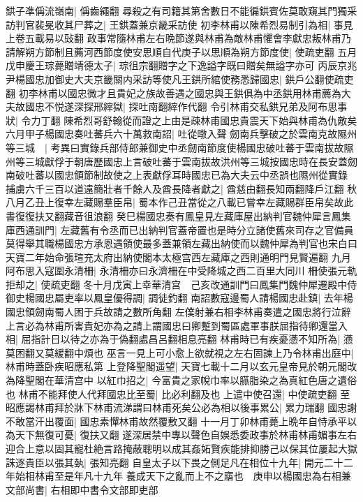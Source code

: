 鉷子凖偁流嶺南|{
	偁齒繩翻}
尋殺之有司籍其第舍數日不能徧鉷賓佐莫敢窺其門獨采訪判官裴冕收其尸葬之|{
	王鉷蓋兼京畿采訪使}
初李林甫以陳希烈易制引為相|{
	事見上卷五載易以䜴翻}
政事常隨林甫左右晩節遂與林甫為敵林甫懼會李獻忠叛林甫乃請解朔方節制且薦河西節度使安思順自代庚子以思順為朔方節度使|{
	使疏吏翻}
五月戊申慶王琮薨贈靖德太子|{
	琮徂宗翻贈字之下逸謚字既曰贈矣無謚字亦可}
丙辰京兆尹楊國忠加御史大夫京畿關内采訪等使凡王鉷所綰使務悉歸國忠|{
	鉷戶公翻使疏吏翻}
初李林甫以國忠微才且貴妃之族故善遇之國忠與王鉷俱為中丞鉷用林甫薦為大夫故國忠不悦遂深探邢縡獄|{
	探吐南翻縡作代翻}
令引林甫交私鉷兄弟及阿布思事狀|{
	令力丁翻}
陳希烈哥舒翰從而證之上由是疎林甫國忠貴震天下始與林甫為仇敵矣　六月甲子楊國忠奏吐蕃兵六十萬救南詔|{
	吐從暾入聲}
劒南兵擊破之於雲南克故隰州等三城　|{
	考異曰實錄兵部侍郎兼御史中丞劒南節度使楊國忠破吐蕃于雲南拔故隰州等三城獻俘于朝唐歷國忠上言破吐蕃于雲南拔故洪州等三城按國忠時在長安蓋劒南破吐蕃以國忠領節制故使之上表獻俘耳時國忠已為大夫云中丞誤也隰州從實錄}
捕虜六千三百以道遠簡壯者千餘人及酋長降者獻之|{
	酋慈由翻長知兩翻降戶江翻}
秋八月乙丑上復幸左藏賜羣臣帛|{
	蜀本作己丑當從之八載已嘗幸左藏賜群臣帛矣故此書復復扶又翻藏音徂浪翻}
癸巳楊國忠奏有鳳皇見左藏庫屋出納判官魏仲犀言鳳集庫西通訓門|{
	左藏舊有令丞而已出納判官蓋帝置也是時分立諸使舊來司存之官備員莫得舉其職楊國忠方承恩遇領使最多蓋兼領左藏出納使而以魏仲犀為判官也宋白曰天寶二年始命張瑄充太府出納使閣本太極宫西左藏庫之西則通明門見賢遍翻}
九月阿布思入寇圍永清柵|{
	永清柵亦曰永濟柵在中受降城之西二百里大同川}
柵使張元軌拒却之|{
	使疏吏翻}
冬十月戊寅上幸華清宫　己亥改通訓門曰鳳集門魏仲犀遷殿中侍御史楊國忠屬吏率以鳳皇優得調|{
	調徒釣翻}
南詔數寇邊蜀人請楊國忠赴鎮|{
	去年楊國忠領劒南蜀人困于兵故請之數所角翻}
左僕射兼右相李林甫奏遣之國忠將行泣辭上言必為林甫所害貴妃亦為之請上謂國忠曰卿蹔到蜀區處軍事朕屈指待卿還當入相|{
	屈指計日以待之亦為于偽翻處昌呂翻相息亮翻}
林甫時已有疾憂懣不知所為|{
	懣莫困翻又莫緩翻中煩也}
巫言一見上可小愈上欲就視之左右固諫上乃令林甫出庭中|{
	林甫時蓋卧疾昭應私第}
上登降聖閣遥望|{
	天寶七載十二月以玄元皇帝見於朝元閣改為降聖閣在華清宫中}
以紅巾招之|{
	今富貴之家帨巾率以臙脂染之為真紅色唐之遺俗也}
林甫不能拜使人代拜國忠比至蜀|{
	比必利翻及也}
上遣中使召還|{
	中使疏吏翻}
至昭應謁林甫拜於牀下林甫流涕謂曰林甫死矣公必為相以後事累公|{
	累力瑞翻}
國忠謝不敢當汗出覆面|{
	國忠素憚林甫故然覆敷又翻}
十一月丁卯林甫薨上晩年自恃承平以為天下無復可憂|{
	復扶又翻}
遂深居禁中專以聲色自娛悉委政事於林甫林甫媚事左右迎合上意以固其寵杜絶言路掩蔽聰明以成其姦妬賢疾能排抑勝己以保其位屢起大獄誅逐貴臣以張其埶|{
	張知亮翻}
自皇太子以下畏之側足凡在相位十九年|{
	開元二十二年始相林甫至是年凡十九年}
養成天下之亂而上不之寤也　庚申以楊國忠為右相兼文部尚書|{
	右相即中書令文部即吏部}
